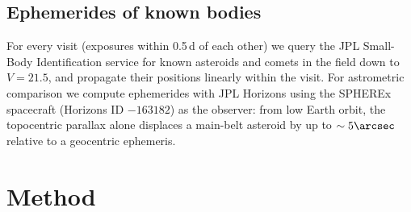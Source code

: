 \documentclass[twocolumn,linenumbers,anonymous]{aastex702}
\begin{document}
\subsection{Ephemerides of known bodies}
For every visit (exposures within 0.5\,d of each other) we query the JPL Small-Body Identification service for known asteroids and comets in the field down to $V = 21.5$, and propagate their positions linearly within the visit. For astrometric comparison we compute ephemerides with JPL Horizons \citep{giorgini96} using the SPHEREx spacecraft (Horizons ID $-163182$) as the observer: from low Earth orbit, the topocentric parallax alone displaces a main-belt asteroid by up to $\sim 5\arcsec$ relative to a geocentric ephemeris.

\section{Method}\label{sec:method}
\end{document}

